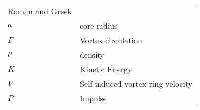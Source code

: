 \begin{table}[ht]
\begin{tabular}{ll}
Roman and Greek &             \\
$a$             & core radius \\
$\Gamma$        & Vortex circulation   \\
$\rho$             & density   \\
$K$             & Kinetic Energy   \\
$V$             & Self-induced vortex ring velocity \\
$P$             & Impulse
\end{tabular}
\end{table}